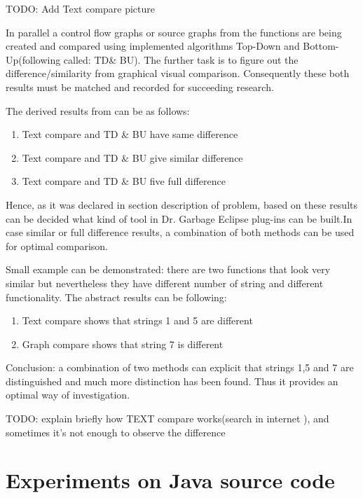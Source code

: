 \documentclass{report}
\begin{document}
TODO: Add Text compare picture

In parallel a control flow graphs or source graphs from the functions are being created and compared using implemented algorithms Top-Down and Bottom-Up(following called: TD\& BU). The further task is to figure out the difference/similarity from graphical visual comparison. Consequently these both results must be matched and recorded for succeeding research.

The derived results from can be as follows: 
\begin{enumerate}
  \item Text compare and TD \& BU have same difference
  \item Text compare and TD \& BU give similar difference
  \item Text compare and TD \& BU five full difference
\end{enumerate}

Hence, as it was declared in section description of problem, based on these results can be decided what kind of tool in Dr. Garbage Eclipse plug-ins can be built.In case similar or full difference results, a combination of both methods can be used for optimal comparison. 

Small example can be demonstrated: there are two functions that look very similar but nevertheless they have different number of string and different functionality. The abstract results can be following:
\begin{enumerate}
	\item Text compare shows that strings 1 and 5 are different
	\item Graph compare shows that string 7 is different 
\end{enumerate}

Conclusion: a combination of two methods can explicit that strings 1,5 and 7 are distinguished and much more distinction has been found. Thus it provides an optimal way of investigation.



TODO: explain briefly how TEXT compare works(search in internet ), and sometimes it's not enough to observe the difference


\section{Experiments on Java source code}
\end{document}
